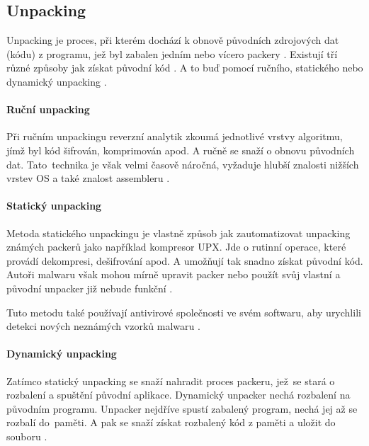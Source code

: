\subsection{Unpacking}
\label{unpackers}

Unpacking je proces, při kterém dochází k obnově původních zdrojových dat (kódu) z programu, jež byl zabalen jedním nebo vícero packery \cite{HoonKang2011}. Existují tří různé způsoby jak získat původní kód \cite{4639028}. A to buď pomocí ručního, statického nebo dynamický unpacking \cite{generic_unpacker}.

\paragraph*{Ruční unpacking}

Při ručním unpackingu reverzní analytik zkoumá jednotlivé vrstvy algoritmu, jímž byl kód šifrován, komprimován apod. A ručně se snaží o obnovu původních dat. Tato~technika je však velmi časově náročná, vyžaduje hlubší znalosti nižších vrstev OS a také znalost assembleru \cite{4639028}. 

\paragraph*{Statický unpacking}

Metoda statického unpackingu je vlastně způsob jak zautomatizovat unpacking známých packerů jako například kompresor UPX. Jde o rutinní operace, které provádí dekompresi, dešifrování apod. A umožňují tak snadno získat původní kód. Autoři malwaru však mohou mírně upravit packer nebo použít svůj vlastní a původní unpacker již nebude funkční \cite{4639028}. 

Tuto metodu také používají antivirové společnosti ve svém softwaru, aby urychlili detekci nových neznámých vzorků malwaru \cite{4639028}.

\paragraph*{Dynamický unpacking}

Zatímco statický unpacking se snaží nahradit proces packeru, jež~se stará o rozbalení a spuštění původní aplikace. Dynamický unpacker nechá rozbalení na původním programu. Unpacker nejdříve spustí zabalený program, nechá jej až se rozbalí do~paměti. A pak se snaží získat rozbalený kód z paměti a uložit do souboru \cite{generic_unpacker}.